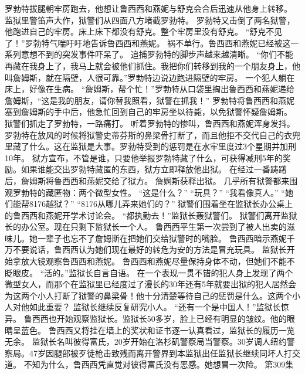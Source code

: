 \documentclass[a4paper,12pt,UTF8,twoside]{ctexbook}
\begin{document}
        罗勃特拔腿朝牢房跑去，他想让鲁西西和燕妮与舒克会合后迅速从他身上转移。  
        监狱里警笛声大作，狱警们从四面八方堵截罗勃特。  
        罗勃特又击倒了两名狱警，他跑进自己的牢房。床上床下都没有舒克。整个牢房里没有舒克。  
        “舒克不见了！”罗勃特气喘吁吁地告诉鲁西西和燕妮。  
        祸不单行。鲁西西和燕妮已经被这一系列意想不到的突发事件吓呆了。  
        追捕罗勃特的脚步声越来越清晰。  
        “你们不能再藏在我身上了，我马上就会被他们抓住。我把你们转移到我的一个朋友身上，他叫詹姆斯，就在隔壁，人很可靠。”罗勃特边说边跑进隔壁的牢房。  
        一个犯人躺在床上，好像在生病。  
        “詹姆斯，帮个忙！”罗勃特从口袋里掏出鲁西西和燕妮递给詹姆斯，“这是我的朋友，请你替我照看，狱警在抓我！”  
        罗勃特将鲁西西和燕妮塞到詹姆斯的手中后，他急忙回到自己的牢房坐以待毙，以免狱警怀疑詹姆斯。  
        狱警们抓走了罗勃特，一路痛打。  
        听着罗勃特的惨叫，鲁西西和燕妮浑身发抖。  
        罗勃特在放风的时候将狱警史蒂芬斯的鼻梁骨打断了，而且他拒不交代自己的衣兜里藏了什么。这在监狱是大事。罗勃特受到的惩罚是在水牢里度过3个星期并加刑10年。  
        狱方宣布，不管是谁，只要他举报罗勃特藏了什么，可获得减刑5年的奖励。如果谁能交出罗勃特藏匿的东西，狱方立即释放他出狱。  
        在经过一番踌躇后，詹姆斯将鲁西西和燕妮交给了狱方。  
        詹婀斯获释出狱。  
        几乎所有狱警都来围观罗勃特的藏匿物：两个微型女性。  
        “这是什么？”  
        “玩具？”  
        “我看像真人。”  
        “她们能帮8176越狱？”  
        “8176从哪儿弄来她们的？”  
        狱警们围着坐在监狱长办公桌上的鲁西西和燕妮开学术讨论会。  
        “都执勤去！”监狱长轰狱警们。  
        狱警们离开监狱长的办公室。现在只剩下监狱长一个人。  
        鲁西西平生第一次尝到了被人出卖的滋味儿。她一辈子也忘不了詹姆斯在把她们交给狱警时的嘴脸。  
        鲁西西暗示燕妮千万不要说话，鲁西西认为她们现在最好的转危为安的方法是冒充玩具。  
        监狱长开始拿放大镜观察鲁西西和燕妮。  
        鲁西西和燕妮尽量保持身体不动，但她们不能不眨眼皮。  
        “活的。”监狱长自言自语。  
        在一个表现一贯不错的犯人身上发现了两个微型女人，而那个在监狱里已经度过了漫长的30年还有5年就要出狱的犯人居然会为这两个小人打断了狱警的鼻梁骨！他十分清楚等待自己的惩罚是什么。这两个小人对他如此重要？  
        监狱长继续反复研究小人。  
        “还有一个是中国人！”监狱长惊异。  
        鲁西西也开始观察监狱长。监狱长50多岁，脸上已经有明显的皱纹。他的眼睛呈蓝色。  
        鲁西西又将挂在墙上的奖状和证书逐一认真看过，监狱长的履历一览无余。  
        监狱长名叫彼得富氏，20岁开始在洛杉矶警察局当警察。30岁调人纽约警察局。47岁因腿部被歹徒枪击致残而离开警界到本监狱出任监狱长继续同坏人打交道。  
        不知为什么，鲁西西凭直觉对彼得富氏没有恶感。她想冒一次险。          第309集  
\end{document}
